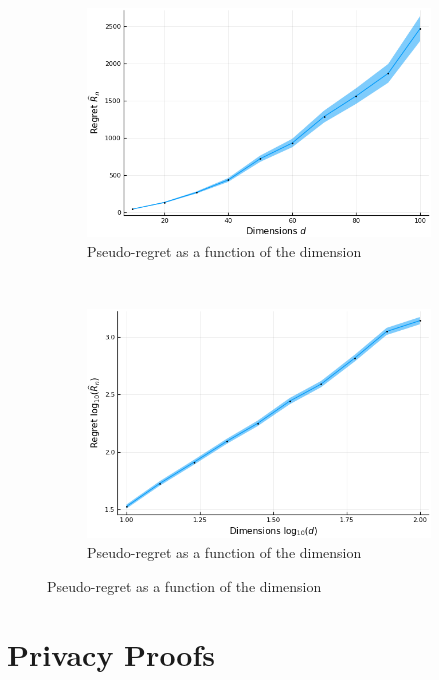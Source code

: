 \documentclass{article}
\begin{document}
\begin{figure}[h]
\centering
    \begin{subfigure}[h]{0.45\textwidth}
        \includegraphics[scale=0.4]{dim-regret.png}
        \caption{Pseudo-regret as a function of the dimension\label{fig:regret_dim}}
    \end{subfigure}~~~~
    \begin{subfigure}[h]{0.45\textwidth}
        \includegraphics[scale=0.4]{dim-regret-logspace.png}
        \caption{\label{fig:regret_dim_logscale}Pseudo-regret as a function of the dimension}      
    \end{subfigure}
\end{figure}

\section{Privacy Proofs}
\label{apx_sec:privacy_proofs}
\end{document}
